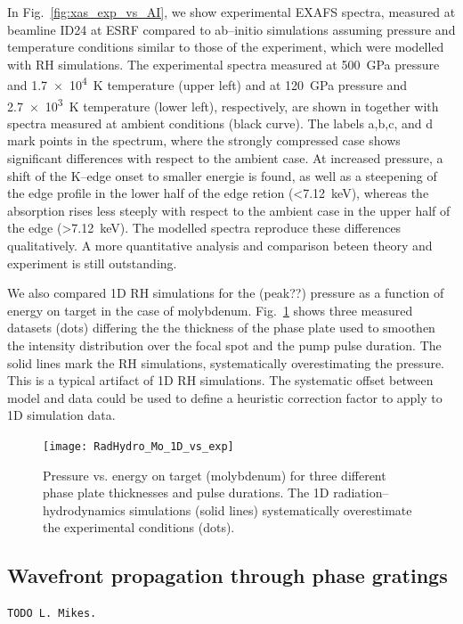 \documentclass[10pt]{scrartcl}
\begin{document}
%
In Fig.~\ref{fig:xas_exp_vs_AI}, we show experimental EXAFS
spectra, measured at beamline ID24 at ESRF \cite{Torchio2016} compared to ab--initio
simulations assuming pressure and temperature conditions similar to those of
the experiment, which were modelled with RH simulations. The experimental spectra
measured at \SI{500}{\giga\pascal} pressure and \SI{1.7e4}{\kelvin} temperature
(upper left) and at \SI{120}{\giga\pascal} pressure and \SI{2.7e3}{\kelvin}
temperature (lower left), respectively, are shown in together with spectra
measured at ambient conditions (black curve). The labels a,b,c, and d mark points
in the spectrum, where the strongly compressed case shows significant
differences with respect to the ambient case. At increased pressure, a shift of
the K--edge onset to smaller energie is found, as well as a steepening of the
edge profile in the lower half of the edge retion
(\SI{<7.12}{\kilo\electronvolt}), whereas the absorption rises less steeply with respect to the
ambient case in the upper half of the edge (\SI{>7.12}{\kilo\electronvolt}).
The modelled spectra reproduce
these differences qualitatively. A more quantitative analysis and comparison
beteen theory and experiment is still outstanding.
%

We also compared 1D RH simulations for the (peak??) pressure as a function
of energy on target in the case of molybdenum. Fig.~\ref{fig:rh_1d_vs_exp}
shows three measured datasets (dots) differing the the thickness of the phase plate
used to smoothen the intensity distribution over the focal spot and the pump
pulse duration. The solid lines mark the RH simulations, systematically
overestimating the pressure. This is a typical artifact of 1D RH simulations.
The systematic offset between model and data could be used to define a heuristic
correction factor to apply to 1D simulation data.
%
\begin{figure}[ht]
  \begin{center}
    \texttt{[image: RadHydro\_Mo\_1D\_vs\_exp]}
  \end{center}
  \caption{Pressure vs. energy on target (molybdenum) for three different phase plate
  thicknesses and pulse durations. The 1D radiation--hydrodynamics simulations
  (solid lines) systematically overestimate the experimental conditions (dots).}
  \label{fig:rh_1d_vs_exp}
\end{figure}

\subsection{Wavefront propagation through phase gratings}
\label{sec:wpg_phasegrating}
\begin{verbatim}
TODO L. Mikes.
\end{verbatim}
%
\FloatBarrier
%
\end{document}

